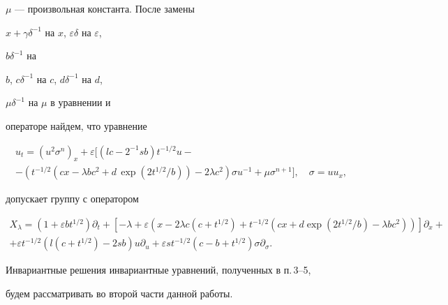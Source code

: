 $\mu$ --- произвольная константа. После замены


$x+\gamma\delta^{-1}$ на $x$, $\varepsilon\delta$ на $\varepsilon$,


$b\delta^{-1}$ на


$b$, $c\delta^{-1}$ на $c$, $d\delta^{-1}$ на $d$,


$\mu\delta^{-1}$ на $\mu$ в уравнении и


операторе найдем, что уравнение


\begin{multline}


u_t=(u^2\sigma^n)_x+\varepsilon[(lc-2^{-1}sb)t^{-1/2}u-\\


-(t^{-1/2}(cx-\lambda bc^2+d\,\exp(2t^{1/2}/b))-


2\lambda c^2)\sigma u^{-1}+\mu\sigma^{n+1}],\quad \sigma=uu_x,


\tag{5.10}


\end{multline}


допускает группу с оператором


\begin{multline}


X_\lambda=(1+\varepsilon bt^{1/2})\partial_t+


[-\lambda+\varepsilon(x-2\lambda c(c+t^{1/2})+t^{-1/2}


(cx+d\exp(2t^{1/2}/b)-\lambda bc^2))]\partial_x+\\


+\varepsilon t^{-1/2}(l(c+t^{1/2})-2sb)


u\partial_u+\varepsilon st^{-1/2}(c-b+t^{1/2})


\sigma\partial_\sigma. \tag{5.11}


\end{multline}





Инвариантные решения инвариантные уравнений, полученных в п.\,3--5,


будем рассматривать во второй части данной работы.





